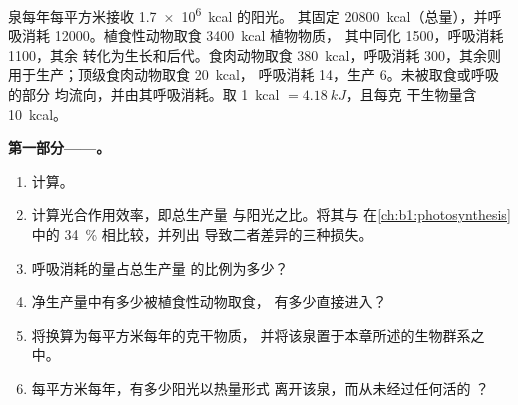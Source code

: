 \begin{problem}
\label{pb:b1:ecosystem-organization:1}
泉每年每平方米接收 \qty{1.7e6}{kcal} 的阳光。
其固定 \qty{20800}{kcal}（总量），并呼吸消耗
\qty{12000}{}。植食性动物取食 \qty{3400}{kcal} 植物物质，
其中同化 \qty{1500}{}，呼吸消耗 \qty{1100}{}，其余
转化为生长和后代。食肉动物取食 \qty{380}{kcal}，呼吸消耗
\qty{300}{}，其余则用于生产；顶级食肉动物取食 \qty{20}{kcal}，
呼吸消耗 \qty{14}{}，生产 \qty{6}{}。未被取食或呼吸的部分
均流向，并由其呼吸消耗。取
\qty{1}{kcal} $= \qty{4.18}{kJ}$，且每克
干生物量含 \qty{10}{kcal}。

\medskip
\noindent\textbf{第一部分——。}
\begin{enumerate}
  \item 计算。
  \item 计算光合作用效率，即总生产量
        与阳光之比。将其与
        在\cref{ch:b1:photosynthesis}中的 \qty{34}{\%} 相比较，并列出
        导致二者差异的三种损失。
  \item {}呼吸消耗的量占总生产量
        的比例为多少？
  \item 净生产量中有多少被植食性动物取食，
        有多少直接进入？
  \item 将换算为每平方米每年的克干物质，
        并将该泉置于本章所述的生物群系之中。
  \item 每平方米每年，有多少阳光以热量形式
        离开该泉，而从未经过任何活的
        ？
\end{enumerate}


\end{problem}
